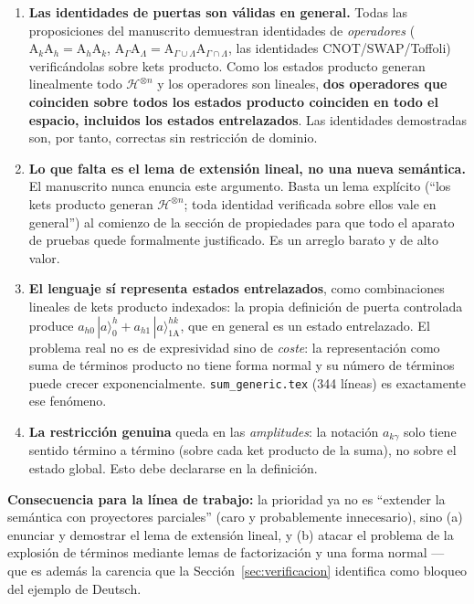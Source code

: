 \documentclass[12pt, a4paper]{article}
\newcommand{\gate}[1]{\text{#1}}
\newcommand{\stateket}[3]{\ket{#1}^{#2}_{#3}}
\newcommand{\ket}[1]{|#1\rangle}
\begin{document}
\begin{enumerate}
  \item \textbf{Las identidades de puertas son válidas en general.}
        Todas las proposiciones del manuscrito demuestran identidades de
        \emph{operadores} ($\gate{A}_k\gate{A}_h = \gate{A}_h\gate{A}_k$,
        $\gate{A}_\Gamma \gate{A}_\Lambda = \gate{A}_{\Gamma\cup\Lambda}
          \gate{A}_{\Gamma\cap\Lambda}$, las identidades CNOT/SWAP/Toffoli)
        verificándolas sobre kets producto. Como los estados producto generan
        linealmente todo $\mathcal{H}^{\otimes n}$ y los operadores son
        lineales, \textbf{dos operadores que coinciden sobre todos los
          estados producto coinciden en todo el espacio, incluidos los estados
          entrelazados}. Las identidades demostradas son, por tanto, correctas
        sin restricción de dominio.

  \item \textbf{Lo que falta es el lema de extensión lineal, no una nueva
          semántica.} El manuscrito nunca enuncia este argumento. Basta un lema
        explícito (``los kets producto generan $\mathcal{H}^{\otimes n}$;
        toda identidad verificada sobre ellos vale en general'') al comienzo
        de la sección de propiedades para que todo el aparato de pruebas
        quede formalmente justificado. Es un arreglo barato y de alto valor.

  \item \textbf{El lenguaje sí representa estados entrelazados}, como
        combinaciones lineales de kets producto indexados: la propia
        definición de puerta controlada produce
        $a_{h0}\,\stateket{a}{h}{0} + a_{h1}\,\stateket{a}{hk}{1\gate{A}}$,
        que en general es un estado entrelazado. El problema real no es de
        expresividad sino de \emph{coste}: la representación como suma de
        términos producto no tiene forma normal y su número de términos puede
        crecer exponencialmente. \texttt{sum\_generic.tex} (344 líneas) es
        exactamente ese fenómeno.

  \item \textbf{La restricción genuina} queda en las \emph{amplitudes}: la
        notación $a_{k\gamma}$ solo tiene sentido término a término (sobre
        cada ket producto de la suma), no sobre el estado global. Esto debe
        declararse en la definición.
\end{enumerate}

\textbf{Consecuencia para la línea de trabajo:} la prioridad ya no es
``extender la semántica con proyectores parciales'' (caro y probablemente
innecesario), sino (a) enunciar y demostrar el lema de extensión lineal, y
(b) atacar el problema de la explosión de términos mediante lemas de
factorización y una forma normal --- que es además la carencia que la
Sección~\ref{sec:verificacion} identifica como bloqueo del ejemplo de Deutsch.
\end{document}
